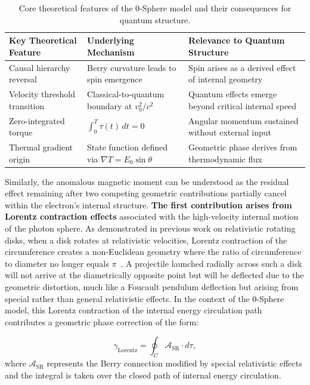 \documentclass[%
 reprint,
 amsmath,amssymb,
 aps,
]{revtex4-1}
\numberwithin{equation}{section}%
\begin{document}
\begin{table}[t!]
\centering
\caption{Core theoretical features of the 0-Sphere model and their consequences for quantum structure.}
\label{tab:structural_features}
\renewcommand{\arraystretch}{1.4}
\begin{tabular}{p{5.0cm}p{5.5cm}p{5.5cm}}
\toprule
\textbf{Key Theoretical Feature} & \textbf{Underlying Mechanism} & \textbf{Relevance to Quantum Structure} \\
\midrule
Causal hierarchy reversal & Berry curvature leads to spin emergence & Spin arises as a derived effect of internal geometry \\
\addlinespace[0.3cm]
Velocity threshold transition & Classical-to-quantum boundary at $v_0^2/c^2$ & Quantum effects emerge beyond critical internal speed \\
\addlinespace[0.3cm]
Zero-integrated torque & $\int_0^T \tau(t)\,dt = 0$ & Angular momentum sustained without external input \\
\addlinespace[0.3cm]
Thermal gradient origin & State function defined via $\nabla T = E_0\sin\theta$ & Geometric phase derives from thermodynamic flux \\
\bottomrule
\end{tabular}
\end{table}


Similarly, the anomalous magnetic moment can be understood as the residual effect remaining after two competing geometric contributions partially cancel within the electron's internal structure. \textbf{The first contribution arises from Lorentz contraction effects} associated with the high-velocity internal motion of the photon sphere. As demonstrated in previous work on relativistic rotating disks, when a disk rotates at relativistic velocities, Lorentz contraction of the circumference creates a non-Euclidean geometry where the ratio of circumference to diameter no longer equals $\pi$~\cite{einstein1912}. A projectile launched radially across such a disk will not arrive at the diametrically opposite point but will be deflected due to the geometric distortion, much like a Foucault pendulum deflection but arising from special rather than general relativistic effects. In the context of the 0-Sphere model, this Lorentz contraction of the internal energy circulation path contributes a geometric phase correction of the form:

\begin{equation}
\gamma_{\text{Lorentz}} = \oint_C \mathcal{A}_{\text{SR}} \cdot d\tau, \label{eq:lorentz_phase}
\end{equation}
where $\mathcal{A}_{\text{SR}}$ represents the Berry connection modified by special relativistic effects and the integral is taken over the closed path of internal energy circulation.
\end{document}
